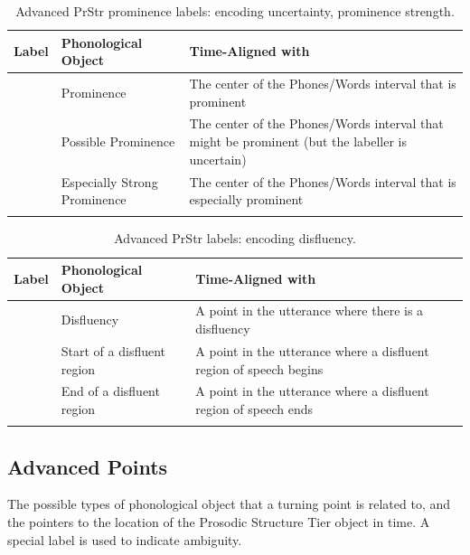 \documentclass[11pt, twoside]{memoir}
\def\textlabel#1{{\relsize{-.5}\fontspec[Mapping=tex-text]{Roboto Mono}{#1}}}
\begin{document}
\begin{longtable}{cp{.3\linewidth}p{.45\linewidth}}
	\toprule
	\textbf{Label} & \textbf{Phonological Object} & \textbf{Time-Aligned with} \tabularnewline
	\midrule
	\endhead
	\rowcolor{green}
	\textlabel{*} & Prominence & The center of the Phones/Words interval that is prominent\tabularnewline
	\textlabel{?*} & Possible Prominence & The center of the Phones/Words interval that might be prominent (but the labeller is uncertain) \tabularnewline
	\textlabel{**} & Especially Strong Prominence & The center of the Phones/Words interval that is especially prominent \tabularnewline
	\bottomrule
	\caption{Advanced PrStr prominence labels: encoding uncertainty, prominence strength.}
\end{longtable}

\begin{longtable}{cp{.3\linewidth}p{.45\linewidth}}
	\toprule
	\textbf{Label} & \textbf{Phonological Object} & \textbf{Time-Aligned with} \tabularnewline
	\midrule
	\endhead
	\textlabel{d} & Disfluency & A point in the utterance where there is a disfluency\tabularnewline
	\textlabel{\{d} & Start of a disfluent region & A point in the utterance where a disfluent region of speech begins\tabularnewline
	\textlabel{d\}} & End of a disfluent region & A point in the utterance where a disfluent region of speech ends\tabularnewline
	\bottomrule
	\caption{Advanced PrStr labels: encoding disfluency.}
\end{longtable}


\subsection*{Advanced Points}

The possible types of phonological object that a turning point is related to, and the pointers to the location of the Prosodic Structure Tier object in time. A special label is used to indicate ambiguity.
\end{document}
